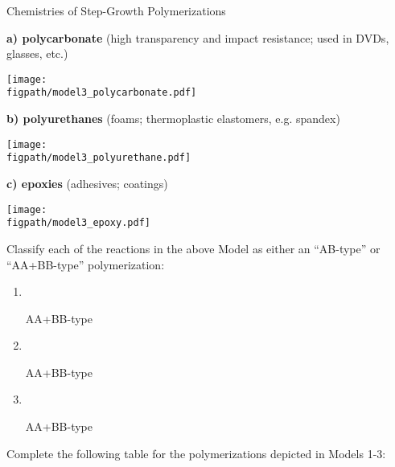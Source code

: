 \begin{activity}{Chemistries of Step-Growth Polymerizations}
\begin{model}
\vspace{0.1in}

\textbf{a) polycarbonate} (high transparency and impact resistance; used in DVDs, glasses, etc.)
		
			\centerline{\texttt{[image: \\figpath/model3\_polycarbonate.pdf]}}

\vspace{0.1in}

\textbf{b) polyurethanes} (foams; thermoplastic elastomers, e.g. spandex)
		
			\centerline{\texttt{[image: \\figpath/model3\_polyurethane.pdf]}}

\vspace{0.1in}

\textbf{c) epoxies} (adhesives; coatings)
		
			\centerline{\texttt{[image: \\figpath/model3\_epoxy.pdf]}}

\end{model}

\vspace{0.25in}
\begin{ctqs}

		\question Classify each of the reactions in the above Model as either an ``AB-type'' or ``AA+BB-type'' polymerization:
		
			\begin{enumerate}
				\item ~ \begin{solution}[0.6in]AA+BB-type\end{solution}
				\item ~ \begin{solution}[0.6in]AA+BB-type\end{solution}
				\item ~ \begin{solution}[0.6in]AA+BB-type\end{solution}
			\end{enumerate}
			
		
		\clearpage
		\question Complete the following table for the polymerizations depicted in Models 1-3:
		

\end{ctqs}
\end{activity}
